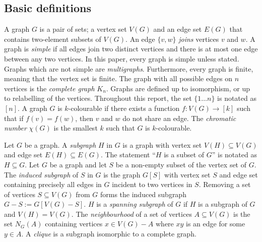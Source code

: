
\subsection{Basic definitions}\label{sec: Basic definitions}
A graph $G$ is a pair of sets; a vertex set $V(G)$ and an edge set $E(G)$ that contains two-element subsets of $V(G)$. An edge $ \{v, w\}$ \textit{joins} vertices $v$ and $w$. A graph is \textit{simple} if all edges join two distinct vertices and there is at most one edge between any two vertices. In this paper, every graph is simple unless stated. Graphs which are not simple are \textit{multigraphs}. Furthermore, every graph is finite, meaning that the vertex set is finite. The graph with all possible edges on $n$ vertices is the \textit{complete graph} $K_n$. Graphs are defined up to isomorphism, or up to relabelling of the vertices.
Throughout this report, the set $\lbrace 1\ldots n \rbrace$ is notated as $[n]$. 
A graph \(G\) is \(k\)-colourable if there exists a function \(f: V(G) \rightarrow [k]\) such that if $f(v) = f(w)$, then $v$ and $w$ do not share an edge. The \textit{chromatic number} \(\chi(G)\) is the smallest \(k\) such that \(G\) is \(k\)-colourable. 

Let $G$ be a graph. A \textit{subgraph} $H$ in $G$ is a graph with vertex set $V(H) \subseteq V(G)$ and edge set $E(H) \subseteq E(G)$. The statement ``$H$ is a subset of $G$'' is notated as $H \subseteq G$.
Let $G$ be a graph and let $S$ be a non-empty subset of the vertex set of $G$. The \textit{induced subgraph} of $S$ in $G$ is the graph $G[S]$ with vertex set $S$ and edge set containing precisely all edges in $G$ incident to two vertices in $S$. Removing a set of vertices $S \subseteq V(G)$ from $G$ forms the induced subgraph $G - S := G[V(G) - S]$. 
$H$ is a \textit{spanning subgraph} of $G$ if $H$ is a subgraph of $G$ and $V(H) = V(G)$. 
The \textit{neighbourhood} of a set of vertices $A \subseteq V(G)$ is the set $N_G(A)$ containing vertices $x \in V(G) - A$ where $xy$ is an edge for some $y \in A$. A \textit{clique} is a subgraph isomorphic to a complete graph. 